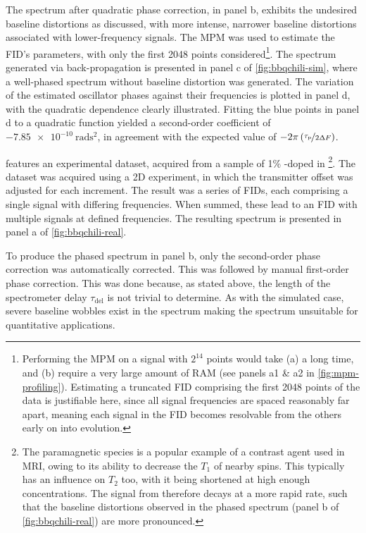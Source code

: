 The spectrum after quadratic phase correction, in panel b, exhibits the
undesired baseline distortions as discussed, with more intense, narrower
baseline distortions associated with lower-frequency signals.
The \ac{MPM} was used to estimate the \ac{FID}'s parameters,
with only the first 2048 points considered\footnote{
    Performing the \ac{MPM} on a signal with $2^{14}$ points would take (a) a
    long time, and (b) require a very large amount of \ac{RAM} (see panels a1
    \& a2 in \cref{fig:mpm-profiling}).
    Estimating a truncated \ac{FID} comprising the first 2048 points of the
    data is justifiable here, since all signal frequencies are spaced
    reasonably far apart, meaning each signal in the \ac{FID} becomes
    resolvable from the others early on into evolution.
}. The spectrum generated via back-propagation is presented in panel c of
\cref{fig:bbqchili-sim}, where a well-phased spectrum without baseline
distortion was generated. The variation of the estimated oscillator
phases against their frequencies is plotted in panel d, with the quadratic
dependence clearly illustrated.  Fitting the blue points in panel d to a
quadratic function yielded a second-order coefficient of
$\qty{-7.85e-10}{\radian\second\squared}$, in agreement with the expected value
of $-2 \pi \left(\nicefrac{\tau_{\text{p}}}{2 \Updelta F}\right)$.

 features an experimental dataset, acquired
from a sample of 1\% -doped  in \footnote{
    The paramagnetic species  is a popular example of a
    contrast agent used in \ac{MRI}, owing to its ability to decrease the $T_1$
    of nearby spins. This typically has an influence on $T_2$ too, with it
    being shortened at high enough concentrations.
    The signal from  therefore decays at a more rapid rate, such that
    the baseline distortions observed in the phased spectrum (panel b of
    \cref{fig:bbqchili-real}) are more pronounced.
}.
The dataset was acquired using a \ac{2D} experiment, in which the transmitter
offset was adjusted for each increment. The result was a series of \acp{FID},
each comprising a single  signal with differing frequencies.
When summed, these lead to an \ac{FID} with multiple signals at defined
frequencies. The resulting spectrum is presented in panel a of
\cref{fig:bbqchili-real}.

To produce the phased spectrum in panel b, only the second-order
phase correction was automatically corrected. This was followed by manual
first-order phase correction.  This was done because, as stated above, the
length of the spectrometer delay $\tau_{\text{del}}$ is not trivial to
determine. As with the simulated case, severe baseline wobbles exist in the
spectrum making the spectrum unsuitable for quantitative applications.

